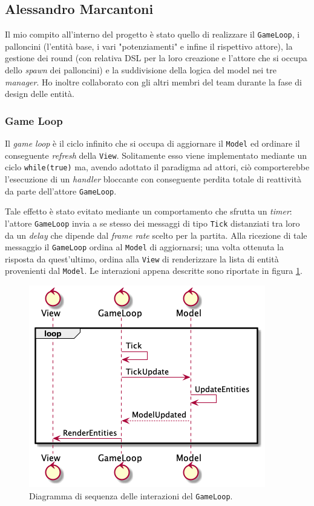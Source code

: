 

\subsection{Alessandro Marcantoni}
Il mio compito all'interno del progetto è stato quello di realizzare il \texttt{GameLoop}, i palloncini (l'entità base,
i vari "potenziamenti" e infine il rispettivo attore), la gestione dei round (con relativa DSL per la loro creazione e
l'attore che si occupa dello \textit{spawn} dei palloncini) e la suddivisione della logica del model nei tre
\textit{manager}. Ho inoltre collaborato con gli altri membri del team durante la fase di design delle entità.

\subsubsection{Game Loop}
Il \textit{game loop} è il ciclo infinito che si occupa di aggiornare il \texttt{Model} ed ordinare il conseguente
\textit{refresh} della \texttt{View}. Solitamente esso viene implementato mediante un ciclo \texttt{while(true)} ma,
avendo adottato il paradigma ad attori, ciò comporterebbe l'esecuzione di un \textit{handler} bloccante con
conseguente perdita totale di reattività da parte dell'attore \texttt{GameLoop}.

Tale effetto è stato evitato mediante un comportamento che sfrutta un \textit{timer}: l'attore \texttt{GameLoop} invia a
se stesso dei messaggi di tipo \texttt{Tick} distanziati tra loro da un \textit{delay} che dipende dal
\textit{frame rate} scelto per la partita. Alla ricezione di tale messaggio il \texttt{GameLoop} ordina al
\texttt{Model} di aggiornarsi; una volta ottenuta la risposta da quest'ultimo, ordina alla \texttt{View} di renderizzare
la lista di entità provenienti dal \texttt{Model}. Le interazioni appena descritte sono riportate in figura
\ref{fig:sequence-gameloop}.

\begin{figure}[H]
    \centering
    \includegraphics[width=.5\linewidth]{img/sequence-gameloop}
    \caption{Diagramma di sequenza delle interazioni del \texttt{GameLoop}.}
    \label{fig:sequence-gameloop}
\end{figure}

